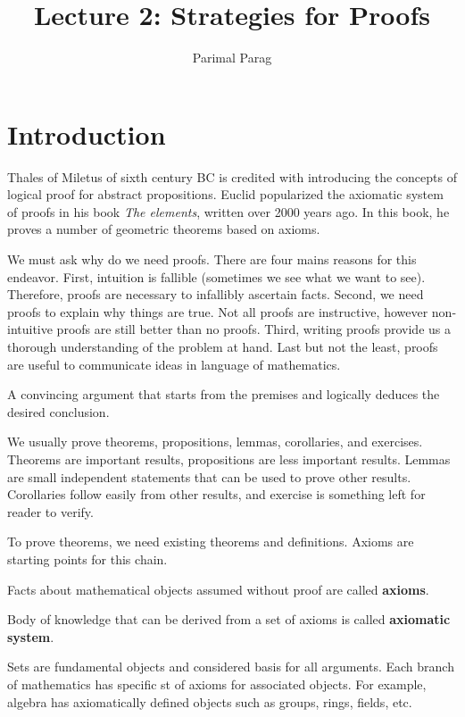 \documentclass[a4paper,english,12pt]{article}
\begin{document}
\title{Lecture 2: Strategies for Proofs}
\author{Parimal Parag}
\maketitle

\section{Introduction}
Thales of Miletus of sixth century BC is credited with introducing the concepts of logical proof for abstract propositions. Euclid popularized the axiomatic system of proofs in his book \emph{The elements}, written over 2000 years ago. In this book, he proves a number of geometric theorems based on axioms.

We must ask why do we need proofs. There are four mains reasons for this endeavor. First, intuition is fallible (sometimes we see what we want to see). Therefore, proofs are necessary to infallibly ascertain facts. Second, we need proofs to explain why things are true. Not all proofs are instructive, however non-intuitive proofs are still better than no proofs. Third, writing proofs provide us a thorough understanding of the problem at hand. Last but not the least, proofs are useful to communicate ideas in language of mathematics. 

\begin{defn} A convincing argument that starts from the premises and logically deduces the desired conclusion.
\end{defn}
We usually prove theorems, propositions, lemmas, corollaries, and exercises. Theorems are important results, propositions are less important results. Lemmas are small independent statements that can be used to prove other results. Corollaries follow easily from other results, and exercise is something left for reader to verify. 

To prove theorems, we need existing theorems and definitions. Axioms are starting points for this chain.
\begin{defn}[Axioms] Facts about mathematical objects assumed without proof are called \textbf{axioms}.
\end{defn}
\begin{defn} Body of knowledge that can be derived from a set of axioms is called \textbf{axiomatic system}.
\end{defn}
Sets are fundamental objects and considered basis for all arguments. Each branch of mathematics has specific st of axioms for associated objects. For example, algebra has axiomatically defined objects such as groups, rings, fields, etc.
\end{document}
